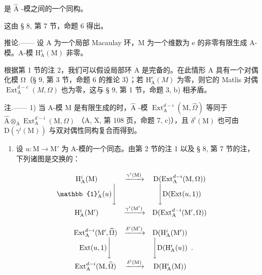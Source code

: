 是 \(\widehat{\mathrm{A}}\) -模之间的一个同构。

这由 § 8, 第 7 节，命题 6 得出。

推论.—— 设 A 为一个局部 Macaulay 环，M 为一个维数为 e 的非零有限生成 A-模。A-模 \(\mathrm{H}_{\mathrm{A}}^{e}(\mathrm{M})\) 非零。

根据第 1 节的注 2，我们可以假设局部环 A 是完备的。在此情形 A 具有一个对偶化模 Ω（§ 9, 第 3 节，命题 6 的推论 3）；若 \(\mathrm{H}_{\mathrm{A}}^{e}(M)\) 为零，则它的 Matlis 对偶 \(\operatorname{Ext}_{\mathrm{A}}^{d-e}(M, \Omega)\) 也为零，这与 § 9, 第 1 节，命题 3, b) 相矛盾。

注.—— 1) 当 A-模 M 是有限生成的时，\(\widehat{\mathrm{A}}\) -模 \(\operatorname{Ext}_{\mathrm{A}}^{d-i}(\mathrm{M}, \widehat{\Omega})\) 等同于 \(\widehat{\mathrm{A}} \otimes_{\mathrm{A}} \operatorname{Ext}_{\mathrm{A}}^{d-i}(\mathrm{M}, \Omega)\) （A, X, 第 108 页，命题 7, c)），且 \(\delta^{i}(\mathrm{M})\) 也可由 \(\mathrm{D}(\gamma^{i}(\mathrm{M}))\) 与双对偶性同构复合而得到。

\begin{enumerate}
\def\labelenumi{\arabic{enumi})}
\setcounter{enumi}{1}
\tightlist
\item
  设 \(u: \mathrm{M} \to \mathrm{M}'\) 为 A-模的一个同态。由第 2 节的注 1 以及 § 8, 第 7 节的注，下列诸图是交换的：
\end{enumerate}

\[
\begin{array}{c c c} \mathrm{H} _ {\mathrm{A}} ^ {i} (\mathrm{M}) & \xrightarrow {\gamma^ {i} (\mathrm{M})} & \mathrm{D} (\mathrm{Ext} _ {\mathrm{A}} ^ {d - i} (\mathrm{M}, \Omega)) \\ \mathbb {1} _ {\mathrm{A}} ^ {i} (u) \Bigg \downarrow & & \Bigg \downarrow \mathrm{D} (\mathrm{Ext} (u, 1)) \\ \mathrm{H} _ {\mathrm{A}} ^ {i} (\mathrm{M} ^ {\prime}) & \xrightarrow {\gamma^ {i} (\mathrm{M} ^ {\prime})} & \mathrm{D} (\mathrm{Ext} _ {\mathrm{A}} ^ {d - i} (\mathrm{M} ^ {\prime}, \Omega)) \end{array}
\]

\[
\begin{array}{c c c} \operatorname{Ext} _ {\mathrm{A}} ^ {d - i} (\mathrm{M} ^ {\prime}, \widehat {\Omega}) & \xrightarrow {\delta^ {i} (\mathrm{M} ^ {\prime})} & \mathrm{D} (\mathrm{H} _ {\mathrm{A}} ^ {i} (\mathrm{M} ^ {\prime})) \\ \operatorname{Ext} (u, 1) \Bigg \downarrow & & \Bigg \downarrow \mathrm{D} (\mathrm{H} _ {\mathrm{A}} ^ {i} (u)) \\ \operatorname{Ext} _ {\mathrm{A}} ^ {d - i} (\mathrm{M}, \widehat {\Omega}) & \xrightarrow {\delta^ {i} (\mathrm{M})} & \mathrm{D} (\mathrm{H} _ {\mathrm{A}} ^ {i} (\mathrm{M})) \end{array} .
\]

